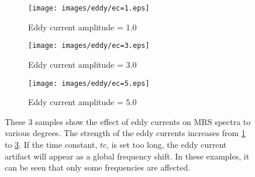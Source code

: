 \begin{figure}[t]
    \centering
    \begin{subfigure}{0.32\textwidth}
        \texttt{[image: images/eddy/ec=1.eps]}
        \caption{Eddy current amplitude = 1.0}
        \label{subfig:ec=1}        
    \end{subfigure}
    \begin{subfigure}{0.32\textwidth}
        \texttt{[image: images/eddy/ec=3.eps]}
        \caption{Eddy current amplitude = 3.0}
        \label{subfig:ec=3}        
    \end{subfigure}
    \begin{subfigure}{0.32\textwidth}
        \texttt{[image: images/eddy/ec=5.eps]}
        \caption{Eddy current amplitude = 5.0}
        \label{subfig:ec=5}        
    \end{subfigure}
    \caption{These 3 samples show the effect of eddy currents on MRS spectra to various degrees. The strength of the eddy currents increases from \ref{subfig:ec=1} to \ref{subfig:ec=5}. If the time constant, $tc$, is set too long, the eddy current artifact will appear as a global frequency shift. In these examples, it can be seen that only some frequencies are affected.}
    \label{fig:eddy currents}
\end{figure}
